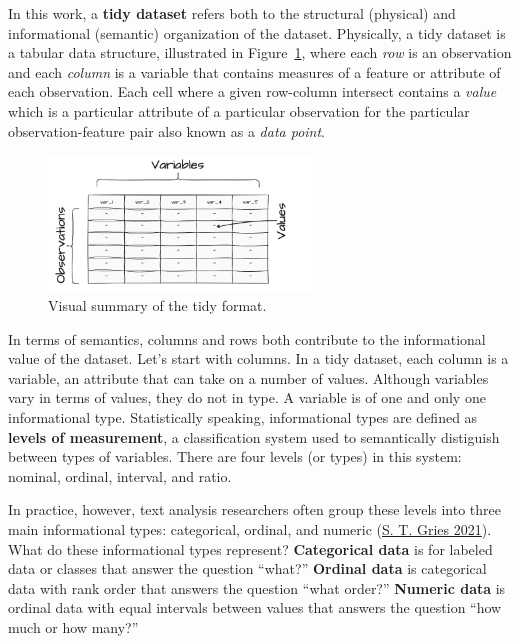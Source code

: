 \documentclass[
  letterpaper,
  DIV=11,
  numbers=noendperiod]{scrreport}
\theoremstyle{definition}
\theoremstyle{remark}
\begin{document}
In this work, a \textbf{tidy dataset} refers both to the structural
(physical) and informational (semantic) organization of the dataset.
Physically, a tidy dataset is a tabular data structure, illustrated in
Figure~\ref{fig-ud-tidy-format-image}, where each \emph{row} is an
observation and each \emph{column} is a variable that contains measures
of a feature or attribute of each observation. Each cell where a given
row-column intersect contains a \emph{value} which is a particular
attribute of a particular observation for the particular
observation-feature pair also known as a \emph{data point}.

\begin{figure}[H]

{\centering \includegraphics[width=2.76in,height=\textheight]{figures/understanding-data/ud-tidy.drawio.png}

}

\caption{\label{fig-ud-tidy-format-image}Visual summary of the tidy
format.}

\end{figure}

In terms of semantics, columns and rows both contribute to the
informational value of the dataset. Let's start with columns. In a tidy
dataset, each column is a variable, an attribute that can take on a
number of values. Although variables vary in terms of values, they do
not in type. A variable is of one and only one informational type.
Statistically speaking, informational types are defined as
\textbf{levels of measurement}, a classification system used to
semantically distiguish between types of variables. There are four
levels (or types) in this system: nominal, ordinal, interval, and ratio.

In practice, however, text analysis researchers often group these levels
into three main informational types: categorical, ordinal, and numeric
(\protect\hyperlink{ref-Gries2021a}{S. T. Gries 2021}). What do these
informational types represent? \textbf{Categorical data} is for labeled
data or classes that answer the question ``what?'' \textbf{Ordinal data}
is categorical data with rank order that answers the question ``what
order?'' \textbf{Numeric data} is ordinal data with equal intervals
between values that answers the question ``how much or how many?''
\end{document}
